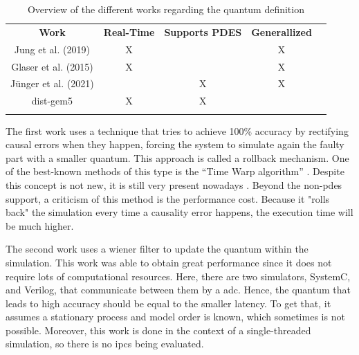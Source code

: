 \begin{table}[H]
\centering
\begin{tabular}{ccccl}
\cline{1-4}
\multicolumn{1}{|c|}{\cellcolor[HTML]{9B9B9B}\textbf{Work}} & \multicolumn{1}{c|}{\cellcolor[HTML]{9B9B9B}\textbf{Real-Time}} & \multicolumn{1}{c|}{\cellcolor[HTML]{9B9B9B}\textbf{Supports PDES}} & \multicolumn{1}{c|}{\cellcolor[HTML]{9B9B9B}\textbf{Generallized}} &  \\ \cline{1-4}
\multicolumn{1}{|c|}{Jung et al. \cite{optimist2} (2019)} & \multicolumn{1}{c|}{X} & \multicolumn{1}{c|}{} & \multicolumn{1}{c|}{X} &  \\ \cline{1-4}
\multicolumn{1}{|c|}{Glaser et al. \cite{GlaserTD} (2015)} & \multicolumn{1}{c|}{X} & \multicolumn{1}{c|}{} & \multicolumn{1}{c|}{X} &  \\ \cline{1-4}
\multicolumn{1}{|c|}{Jünger et al. \cite{optimizingTD} (2021)} & \multicolumn{1}{c|}{} & \multicolumn{1}{c|}{X} & \multicolumn{1}{c|}{X} &  \\ \cline{1-4}
\multicolumn{1}{|c|}{dist-gem5 \cite{dist-gem5}} & \multicolumn{1}{c|}{X} & \multicolumn{1}{c|}{X} & \multicolumn{1}{c|}{} &  \\ \cline{1-4}
\multicolumn{1}{l}{} & \multicolumn{1}{l}{} & \multicolumn{1}{l}{} & \multicolumn{1}{l}{} & 
\end{tabular}
\caption{Overview of the different works regarding the quantum definition}
\label{tab_OverviewDynamicQuantum}
\end{table}

The first work uses a technique that tries to achieve 100\% accuracy by rectifying causal errors when they happen, forcing the system to 
simulate again the faulty part with a smaller quantum. This approach is called a rollback mechanism. One of the best-known methods of this 
type is the “Time
Warp algorithm” \cite{jefferson1985virtual}. Despite this concept is not new, it is still very present nowadays \cite{busnot2020standard}. 
Beyond the non-\gls{pdes} support, a criticism of this method is the performance cost. Because it "rolls back" the simulation every time a 
causality error happens, the execution time will be much higher.

The second work uses a wiener filter to update the quantum within the simulation. This work was able to obtain great performance since it 
does not require lots of computational resources. Here, there are two simulators, SystemC, and Verilog, that communicate between them by 
a \gls{adc}. Hence, the quantum that leads to high accuracy should be equal to the smaller latency. To get that, it assumes a stationary 
process and model order is known, which sometimes is not possible. Moreover, this work is done in the context of a single-threaded simulation, 
so there is no \glspl{ipc} being evaluated.

